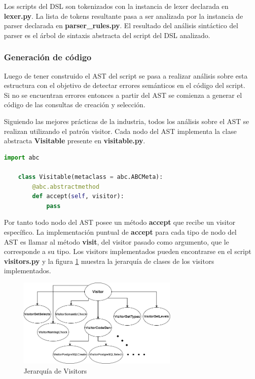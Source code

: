 Los scripts del DSL son tokenizados con la instancia de lexer declarada en \textbf{lexer.py}. La lista de tokens 
resultante pasa a ser analizada por la instancia de parser declarada en \textbf{parser\_rules.py}. El resultado 
del análisis sintáctico del parser es el \'arbol de sintaxis abstracta del script del DSL analizado.


\subsubsection{Generaci\'on de c\'odigo}

Luego de tener construido el AST del script se pasa a realizar análisis sobre esta estructura con 
el objetivo de detectar errores semánticos en el código del script. Si no se encuentran errores 
entonces a partir del AST se comienza a generar el código de las consultas de creación y selección.

Siguiendo las mejores prácticas de la industria, todos los análisis sobre el AST se realizan 
utilizando el patrón visitor\cite{buttner2004digging}. Cada nodo del AST implementa la clase abstracta 
\textbf{Visitable} presente en \textbf{visitable.py}. 

\begin{lstlisting}[label={code:visitable}, caption={Clase abstracta Visitable}, language={python}]
    import abc

    class Visitable(metaclass = abc.ABCMeta):
        @abc.abstractmethod
        def accept(self, visitor):
            pass
\end{lstlisting}

Por tanto todo nodo del AST posee un método \textbf{accept} que recibe un visitor específico. La implementación 
puntual de \textbf{accept} para cada tipo de nodo del AST es llamar al método \textbf{visit}, del visitor pasado como argumento, 
que le corresponde a su tipo. Los visitors implementados pueden encontrarse en el script \textbf{visitors.py} y la 
figura \ref{fig:visitors} muestra la jerarquía de clases de los visitors implementados.

\begin{figure}[htb]
    \centering
    \includegraphics[width=0.7\textwidth]{Graphics/visitorfixed.drawio.png}
    \caption{Jerarquía de Visitors}
    \label{fig:visitors}
\end{figure}


